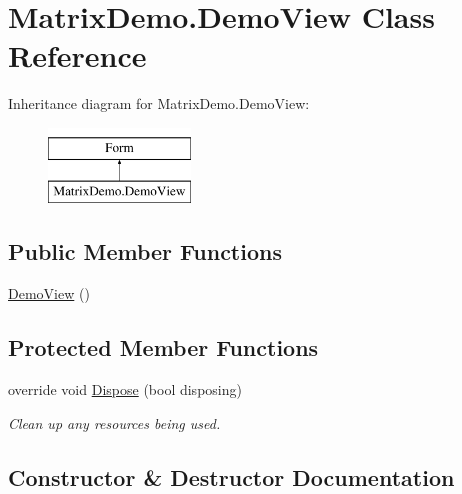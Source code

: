 \hypertarget{class_matrix_demo_1_1_demo_view}{}\section{Matrix\+Demo.\+Demo\+View Class Reference}
\label{class_matrix_demo_1_1_demo_view}
Inheritance diagram for Matrix\+Demo.\+Demo\+View\+:\begin{figure}[H]
\begin{center}
\leavevmode
\includegraphics[height=2.000000cm]{class_matrix_demo_1_1_demo_view}
\end{center}
\end{figure}
\subsection*{Public Member Functions}
\begin{DoxyCompactItemize}
\item 
\mbox{\hyperlink{class_matrix_demo_1_1_demo_view_a5ee0e84d6a82ade59b387064eb9e138d}{Demo\+View}} ()
\end{DoxyCompactItemize}
\subsection*{Protected Member Functions}
\begin{DoxyCompactItemize}
\item 
override void \mbox{\hyperlink{class_matrix_demo_1_1_demo_view_a81f680e49d2873816234e512c49f07b7}{Dispose}} (bool disposing)
\begin{DoxyCompactList}\small\item\em Clean up any resources being used. \end{DoxyCompactList}\end{DoxyCompactItemize}


\subsection{Constructor \& Destructor Documentation}
\mbox{\label{class_matrix_demo_1_1_demo_view_a5ee0e84d6a82ade59b387064eb9e138d}} 
